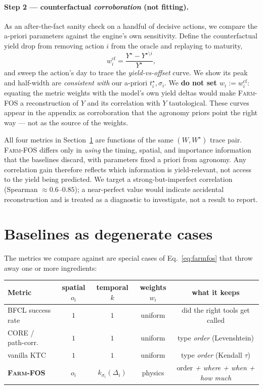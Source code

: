 \documentclass[11pt]{article}
\newcommand{\farmfos}{\textsc{Farm-FOS}}
\begin{document}
\paragraph{Step 2 --- counterfactual \emph{corroboration} (not fitting).}
As an after-the-fact sanity check on a handful of decisive actions, we compare
the a-priori parameters against the engine's own sensitivity. Define the
counterfactual yield drop from removing action $i$ from the oracle and replaying
to maturity,
\[
w_i^{\mathrm{cf}}=\frac{Y^\star-Y^{\star\setminus i}}{Y^\star},
\]
and sweep the action's day to trace the \emph{yield-vs-offset} curve. We show its
peak and half-width are \emph{consistent with} our a-priori $t^\star_i,\sigma_i$.
We \textbf{do not set $w_i:=w_i^{\mathrm{cf}}$}: equating the metric weights with
the model's own yield deltas would make \farmfos{} a reconstruction of $Y$ and
its correlation with $Y$ tautological. These curves appear in the appendix as
corroboration that the agronomy priors point the right way --- not as the source
of the weights.

\begin{remark}
All four metrics in Section~\ref{sec:baselines} are functions of the same
$(W,W^\star)$ trace pair. \farmfos{} differs only in \emph{using} the timing,
spatial, and importance information that the baselines discard, with parameters
fixed a priori from agronomy. Any correlation gain therefore reflects which
information is yield-relevant, not access to the yield being predicted. We target
a strong-but-imperfect correlation (Spearman $\approx 0.6$--$0.85$); a
near-perfect value would indicate accidental reconstruction and is treated as a
diagnostic to investigate, not a result to report.
\end{remark}

\section{Baselines as degenerate cases}
\label{sec:baselines}

The metrics we compare against are special cases of Eq.~\eqref{eq:farmfos} that
throw away one or more ingredients:

\begin{center}\small
\begin{tabular}{lcccc}
\toprule
Metric & spatial $o_i$ & temporal $k$ & weights $w_i$ & what it keeps \\
\midrule
BFCL success rate     & $1$ & $1$ & uniform & did the right tools get called \\
CORE / path-corr.\    & $1$ & $1$ & uniform & type \emph{order} (Levenshtein) \\
vanilla KTC           & $1$ & $1$ & uniform & type \emph{order} (Kendall $\tau$) \\
\textbf{\farmfos}     & $o_i$ & $k_{\sigma_i}(\Delta_i)$ & physics & order \emph{+ where + when + how much} \\
\bottomrule
\end{tabular}
\end{center}
\end{document}
